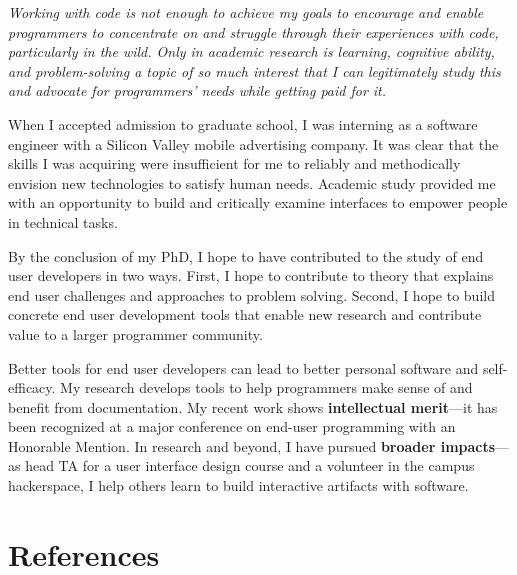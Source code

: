 \documentclass[12pt]{memoir}
\begin{document}
\fi


\emph{%
Working with code is not enough to achieve my goals to encourage and enable programmers to concentrate on and struggle through their experiences with code, particularly in the wild.
Only in academic research is learning, cognitive ability, and problem-solving a topic of so much interest that I can legitimately study this and advocate for programmers' needs while getting paid for it.
}

When I accepted admission to graduate school, I was interning as a software engineer with a Silicon Valley mobile advertising company.
It was clear that the skills I was acquiring were insufficient for me to reliably and methodically envision new technologies to satisfy human needs.
Academic study provided me with an opportunity to build and critically examine interfaces to empower people in technical tasks.

By the conclusion of my PhD, I hope to have contributed to the study of end user developers in two ways.
First, I hope to contribute to theory that explains end user challenges and approaches to problem solving.
Second, I hope to build concrete end user development tools that enable new research and contribute value to a larger programmer community.

Better tools for end user developers can lead to better personal software and self-efficacy.
My research develops tools to help programmers make sense of and benefit from documentation.
My recent work shows \textbf{intellectual merit}---it has been recognized at a major conference on end-user programming with an Honorable Mention.
In research and beyond, I have pursued \textbf{broader impacts}---as head TA for a user interface design course and a volunteer in the campus hackerspace, I help others learn to build interactive artifacts with software.
\fi


\section{References}
\printbibliography[heading=none]
\end{document}
